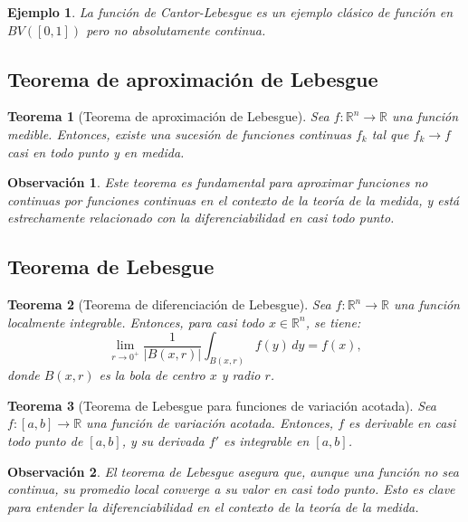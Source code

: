 \documentclass[12pt]{book}
\newtheorem{theorem}{Teorema}
\newtheorem{remark}{Observación}
\newtheorem{ex}{Ejemplo}
\theoremstyle{definition}
\theoremstyle{plain}
\theoremstyle{remark}
\begin{document}
\begin{ex}
La función de Cantor-Lebesgue es un ejemplo clásico de función en \(BV([0,1])\) pero no absolutamente continua.
\end{ex}


\subsection{Teorema de aproximación de Lebesgue} %

\begin{theorem}[Teorema de aproximación de Lebesgue]
Sea \(f: \mathbb{R}^n \to \mathbb{R}\) una función medible. Entonces, existe una sucesión de funciones continuas \(f_k\) tal que \(f_k \to f\) casi en todo punto y en medida.
\end{theorem}

\begin{remark}
Este teorema es fundamental para aproximar funciones no continuas por funciones continuas en el contexto de la teoría de la medida, y está estrechamente relacionado con la diferenciabilidad en casi todo punto.
\end{remark}


\subsection{Teorema de Lebesgue}

\begin{theorem}[Teorema de diferenciación de Lebesgue]
Sea \(f: \mathbb{R}^n \to \mathbb{R}\) una función localmente integrable. Entonces, para casi todo \(x \in \mathbb{R}^n\), se tiene:
\[
\lim_{r \to 0^+} \frac{1}{|B(x,r)|} \int_{B(x,r)} f(y) \, dy = f(x),
\]
donde \(B(x,r)\) es la bola de centro \(x\) y radio \(r\).
\end{theorem}

\begin{theorem}[Teorema de Lebesgue para funciones de variación acotada]
Sea \(f: [a,b] \to \mathbb{R}\) una función de variación acotada. Entonces, \(f\) es derivable en casi todo punto de \([a,b]\), y su derivada \(f'\) es integrable en \([a,b]\).
\end{theorem}

\begin{remark}
El teorema de Lebesgue asegura que, aunque una función no sea continua, su promedio local converge a su valor en casi todo punto. Esto es clave para entender la diferenciabilidad en el contexto de la teoría de la medida.
\end{remark}
\end{document}
